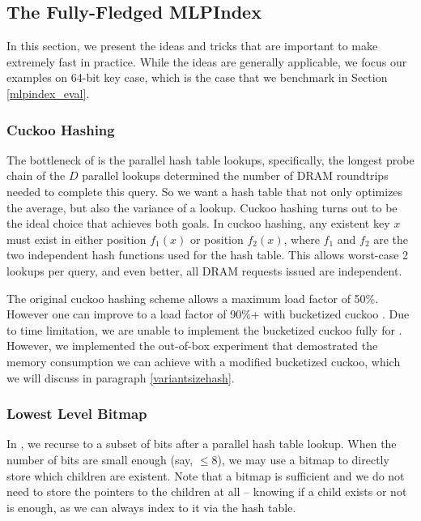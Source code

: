 \documentclass[11pt, usletter]{article}
\begin{document}
\subsection{The Fully-Fledged MLPIndex} \label{mlpindex}

In this section, we present the ideas and tricks that are important to make \MlpIndex 
extremely fast in practice. While the ideas are generally applicable, 
we focus our examples on 64-bit key case, which is the case that we benchmark in Section \ref{mlpindex_eval}.

\subsubsection*{Cuckoo Hashing}

The bottleneck of \MlpIndex is the parallel hash table lookups, 
specifically, the longest probe chain of the $D$ parallel lookups determined the number 
of DRAM roundtrips needed to complete this query. 
So we want a hash table that not only optimizes the average, but also the variance of a lookup. 
Cuckoo hashing \cite{cuckoohash} turns out to be the ideal choice that achieves both goals. 
In cuckoo hashing, any existent key $x$ must exist in either position $f_1(x)$ 
or position $f_2(x)$, where $f_1$ and $f_2$ are the two independent hash functions used for the hash table.
This allows worst-case 2 lookups per query, and even better, all DRAM requests issued are independent. 

The original cuckoo hashing scheme allows a maximum load factor of 50\%. 
However one can improve to a load factor of 90\%+ with bucketized cuckoo \cite{bucketcuckoo}. 
Due to time limitation, we are unable to implement the bucketized cuckoo fully for \MlpIndex. 
However, we implemented the out-of-box experiment that 
demostrated the memory consumption we can achieve with a modified bucketized cuckoo, 
which we will discuss in paragraph \ref{variantsizehash}.

\subsubsection*{Lowest Level Bitmap}

In \MlpIndex, we recurse to a subset of bits after a parallel hash table lookup. 
When the number of bits are small enough (say, $\leq 8$), we may use a bitmap 
to directly store which children are existent. 
Note that a bitmap is sufficient and we do not need to store the pointers to the children at all -- 
knowing if a child exists or not is enough, as we can always index to it via the hash table.
\end{document}
